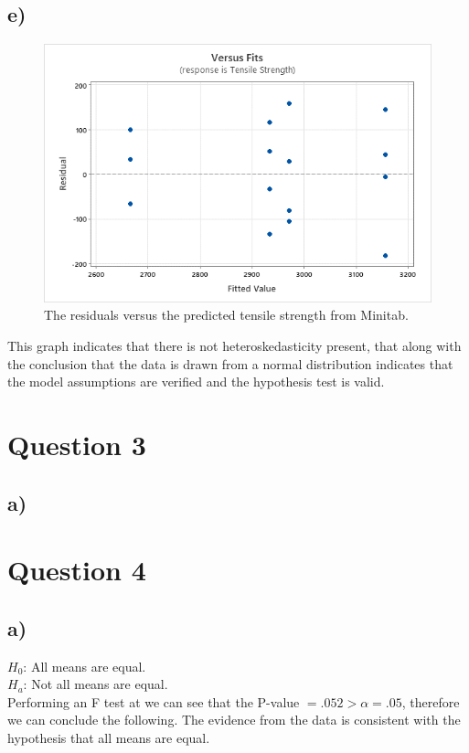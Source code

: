 \documentclass{article}
\begin{document}
\subsection*{e)}
\begin{figure}[h]
    \centering
    \includegraphics[width=1\textwidth]{./images/2_e.png}
    \caption{The residuals versus the predicted tensile strength from Minitab.}
    \label{fig:2_e}
\end{figure}
This graph indicates that there is not heteroskedasticity present,
that along with the conclusion that the data is drawn from
a normal distribution indicates that the model assumptions are verified
and the hypothesis test is valid.

\clearpage
\section*{Question 3}
\subsection*{a)}

\clearpage
\section*{Question 4}
\subsection*{a)}
$H_0$: All means are equal. \\
$H_a$: Not all means are equal. \\
Performing an F test at we can see that the P-value $ = .052 > \alpha = .05$, therefore we can conclude the following.
The evidence from the data is consistent with the hypothesis that all means are equal.
\end{document}
